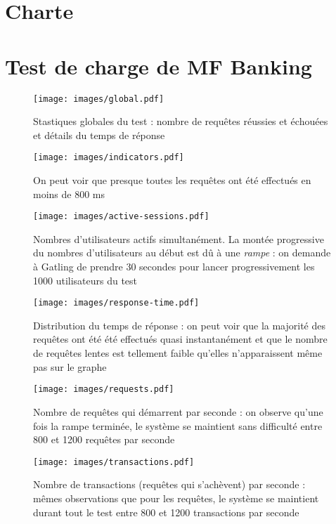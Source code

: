 \appendix

\chapter{Charte \excilys{}}
\label{ann:charte}


\chapter{Test de charge de MF Banking}
\label{ann:gatling}
\begin{figure}[h!]
	\centering
		\texttt{[image: images/global.pdf]}
	\caption{Stastiques globales du test : nombre de requêtes réussies et échouées et détails du temps de réponse}
\end{figure}

\begin{figure}[h!]
	\centering
		\texttt{[image: images/indicators.pdf]}
	\caption{On peut voir que presque toutes les requêtes ont été effectués en moins de 800 ms}
\end{figure}

\begin{figure}[h!]
	\centering
		\texttt{[image: images/active-sessions.pdf]}
	\caption{Nombres d'utilisateurs actifs simultanément. La montée progressive du nombres d'utilisateurs au début est dû à une \textit{rampe} : on demande à Gatling de prendre 30 secondes pour lancer progressivement les 1000 utilisateurs du test}
\end{figure}

\begin{figure}[h!]
	\centering
		\texttt{[image: images/response-time.pdf]}
	\caption{Distribution du temps de réponse : on peut voir que la majorité des requêtes ont été été effectués quasi instantanément et que le nombre de requêtes lentes est tellement faible qu'elles n'apparaissent même pas sur le graphe}
\end{figure}

\begin{figure}[h!]
	\centering
		\texttt{[image: images/requests.pdf]}
	\caption{Nombre de requêtes qui démarrent par seconde : on observe qu'une fois la rampe terminée, le système se maintient sans difficulté entre 800 et 1200 requêtes par seconde}
\end{figure}

\begin{figure}[h!]
	\centering
		\texttt{[image: images/transactions.pdf]}
	\caption{Nombre de transactions (requêtes qui s'achèvent) par seconde : mêmes observations que pour les requêtes, le système se maintient durant tout le test entre 800 et 1200 transactions par seconde}
\end{figure}

